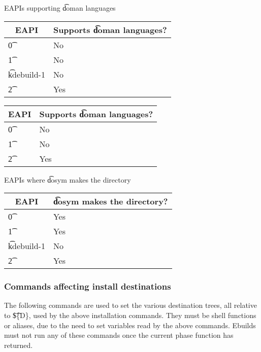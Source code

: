 \begin{centertable}{EAPIs supporting \t{doman} languages} \label{doman-table}
\IFKDEBUILDELSE
{
    \begin{tabular}{ l l }
        \toprule
            \multicolumn{1}{c}{\textbf{EAPI}} &
            \multicolumn{1}{c}{\textbf{Supports \t{doman} languages?}} \\
            \midrule
    \t{0} & No \\
    \t{1} & No \\
    \t{kdebuild-1} & No \\
    \t{2} & Yes \\
    \bottomrule
    \end{tabular}
}{
    \begin{tabular}{ l l }
        \toprule
            \multicolumn{1}{c}{\textbf{EAPI}} &
            \multicolumn{1}{c}{\textbf{Supports \t{doman} languages?}} \\
            \midrule
    \t{0} & No \\
    \t{1} & No \\
    \t{2} & Yes \\
    \bottomrule
    \end{tabular}
}
\end{centertable}

\IFKDEBUILDELSE
{
    \begin{centertable}{EAPIs where \t{dosym} makes the directory} \label{dosym-table}
    \begin{tabular}{ l l }
        \toprule
        \multicolumn{1}{c}{\textbf{EAPI}} &
        \multicolumn{1}{c}{\textbf{\t{dosym} makes the directory?}} \\
        \midrule
    \t{0} & Yes \\
    \t{1} & Yes \\
    \t{kdebuild-1} & No \\
    \t{2} & Yes \\
    \bottomrule
    \end{tabular}
    \end{centertable}
}{
}

\subsubsection{Commands affecting install destinations}
The following commands are used to set the various destination trees, all relative to \t{\$\{D\}},
used by the above installation commands. They must be shell functions or aliases, due to the need to
set variables read by the above commands. Ebuilds must not run any of these commands once the
current phase function has returned.

